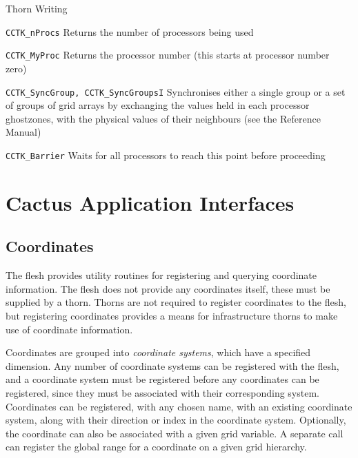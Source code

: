 \begin{cactuspart}{Thorn Writing}
\begin{Lentry}
\item[\texttt{CCTK\_nProcs}] Returns the number of processors being used
\item[\texttt{CCTK\_MyProc}] Returns the processor number (this starts at
  processor number zero)
\item[\texttt{CCTK\_SyncGroup, CCTK\_SyncGroupsI}] Synchronises either a single
  group or a set of groups of grid arrays by
  exchanging the values held in each processor ghostzones, with the
  physical values of their neighbours (see the Reference Manual)
\item[\texttt{CCTK\_Barrier}] Waits for all processors to reach this point
  before proceeding
\end{Lentry}


\section{Cactus Application Interfaces}


\subsection{Coordinates}
\label{sec:CactusAPI.coordinates}

The flesh provides utility routines for registering and querying
coordinate information. The flesh does not provide any coordinates
itself, these must be supplied by a thorn. Thorns are not required to
register coordinates to the flesh, but registering coordinates
provides a means for infrastructure thorns to make use of coordinate
information.

Coordinates are grouped into \textit{coordinate systems}, which have a
specified dimension. Any number of coordinate systems can be
registered with the flesh, and a coordinate system must be registered
before any coordinates can be registered, since they must be
associated with their corresponding system.  Coordinates can be
registered, with any chosen name, with an existing coordinate system,
along with their direction or index in the coordinate system.
Optionally, the coordinate can also be associated with a given grid
variable.  A separate call can register the global range for a
coordinate on a given grid hierarchy.


\end{cactuspart}
